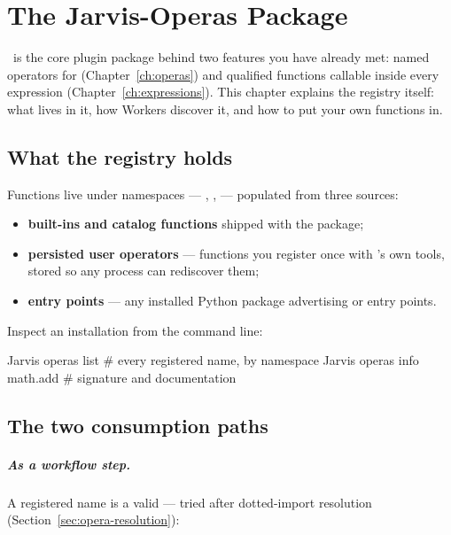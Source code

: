 \chapter{The Jarvis-Operas Package}
\label{ch:jarvis-operas}

 \Operas\ is the core plugin package
behind two features you have already met: named operators for 
(Chapter~\ref{ch:operas}) and qualified functions callable inside every expression
(Chapter~\ref{ch:expressions}). This chapter explains the registry itself: what lives
in it, how Workers discover it, and how to put your own functions in.

\section{What the registry holds}
\label{sec:operas-registry}

Functions live under namespaces --- , ,
 --- populated from three sources:

\begin{itemize}
  \item \textbf{built-ins and catalog functions} shipped with the package;
  \item \textbf{persisted user operators} --- functions you register once with
        \Operas's own tools, stored so any process can rediscover them;
  \item \textbf{entry points} --- any installed Python package advertising
         or  entry points.
\end{itemize}

Inspect an installation from the command line:

\begin{terminal}
\begin{jcmd}
Jarvis operas list            # every registered name, by namespace
Jarvis operas info math.add   # signature and documentation
\end{jcmd}
\end{terminal}

\section{The two consumption paths}
\label{sec:operas-consumption}

\paragraph{As a workflow step.} A registered name is a valid
 --- tried after dotted-import resolution
(Section~\ref{sec:opera-resolution}):

